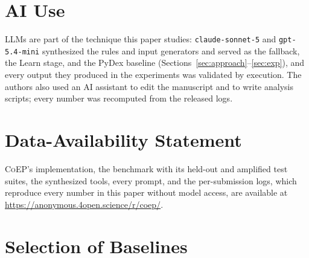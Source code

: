 \documentclass[acmsmall,screen,review,anonymous,nonacm]{acmart}
\newcommand{\tool}{\textsc{CoEP}\xspace}
\newcommand{\cs}{\texttt{claude-sonnet-5}\xspace}
\newcommand{\gm}{\texttt{gpt-5.4-mini}\xspace}
\begin{document}
\section*{AI Use}
LLMs are part of the technique this paper studies: \cs and \gm synthesized the rules and input generators and served as the fallback, the Learn stage, and the PyDex baseline (Sections~\ref{sec:approach}--\ref{sec:exp}), and every output they produced in the experiments was validated by execution. The authors also used an AI assistant to edit the manuscript and to write analysis scripts; every number was recomputed from the released logs.

\section*{Data-Availability Statement}
\tool's implementation, the benchmark with its held-out and amplified test suites, the synthesized tools, every prompt, and the per-submission logs, which reproduce every number in this paper without model access, are available at \url{https://anonymous.4open.science/r/coep/}.




\appendix
\section{Selection of Baselines}
\label{app:baselines}
\end{document}
